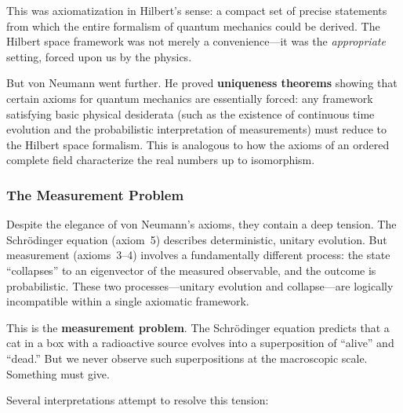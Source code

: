 This was axiomatization in Hilbert's sense: a compact set of precise statements from which the entire formalism of quantum mechanics could be derived. The Hilbert space framework was not merely a convenience---it was the \emph{appropriate} setting, forced upon us by the physics.

But von Neumann went further. He proved \textbf{uniqueness theorems} showing that certain axioms for quantum mechanics are essentially forced: any framework satisfying basic physical desiderata (such as the existence of continuous time evolution and the probabilistic interpretation of measurements) must reduce to the Hilbert space formalism. This is analogous to how the axioms of an ordered complete field characterize the real numbers up to isomorphism.

\subsubsection{The Measurement Problem}

Despite the elegance of von Neumann's axioms, they contain a deep tension. The Schr\"odinger equation (axiom~5) describes deterministic, unitary evolution. But measurement (axioms~3--4) involves a fundamentally different process: the state ``collapses'' to an eigenvector of the measured observable, and the outcome is probabilistic. These two processes---unitary evolution and collapse---are logically incompatible within a single axiomatic framework.

This is the \textbf{measurement problem}. The Schr\"odinger equation predicts that a cat in a box with a radioactive source evolves into a superposition of ``alive'' and ``dead.'' But we never observe such superpositions at the macroscopic scale. Something must give.

Several interpretations attempt to resolve this tension:

